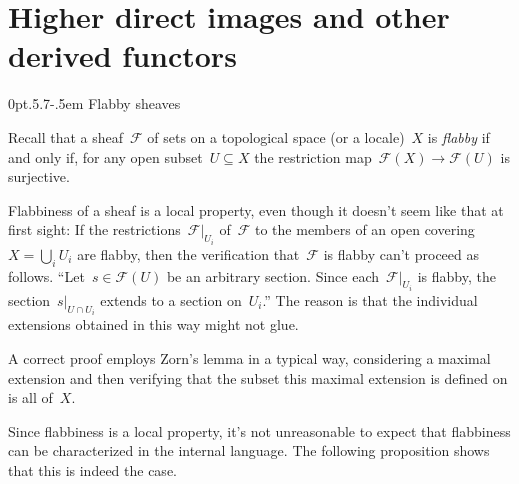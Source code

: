 \documentclass[10pt,reqno,a4paper]{amsbook}
\makeatletter
\theoremstyle{definition}
\theoremstyle{plain}
\theoremstyle{remark}
\newcommand{\F}{\mathcal{F}}
\newcommand{\?}{\,{:}\,}
\renewcommand{\_}{\mathpunct{.}\,}
\def\subsection{\@startsection{subsection}{2}%
  {0pt}{.5\linespacing\@plus.7\linespacing}{-.5em}%
  {\normalfont\bfseries}}
\makeatother
\begin{document}
\section{Higher direct images and other derived functors}

\subsection{Flabby sheaves}

Recall that a sheaf~$\F$ of sets on a topological space (or a locale)~$X$ is
\emph{flabby} if and only if, for any open subset~$U \subseteq X$ the
restriction map~$\F(X) \to \F(U)$ is surjective.

Flabbiness of a sheaf is a local property, even though it doesn't seem like that
at first sight: If the restrictions~$\F|_{U_i}$ of~$\F$ to the members of an
open covering~$X = \bigcup_i U_i$ are flabby, then the verification that~$\F$ is
flabby can't proceed as follows. ``Let~$s \in \F(U)$ be an arbitrary section.
Since each~$\F|_{U_i}$ is flabby, the section~$s|_{U \cap U_i}$ extends to a
section on~$U_i$.'' The reason is that the individual extensions obtained in
this way might not glue.

A correct proof employs Zorn's lemma in a typical way, considering a maximal
extension and then verifying that the subset this maximal extension is defined
on is all of~$X$.

Since flabbiness is a local property, it's not unreasonable to expect that
flabbiness can be characterized in the internal language. The following
proposition shows that this is indeed the case.
\end{document}

